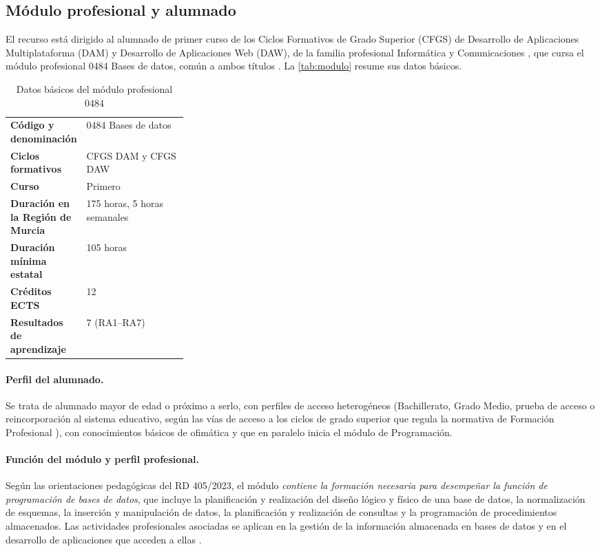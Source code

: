 \documentclass[11pt,a4paper]{article}
\begin{document}
\subsection{Módulo profesional y alumnado}
\label{sec:modulo}

El recurso está dirigido al alumnado de primer curso de los Ciclos Formativos de
Grado Superior (CFGS) de Desarrollo de Aplicaciones Multiplataforma (DAM) y
Desarrollo de Aplicaciones Web (DAW), de la familia profesional Informática y
Comunicaciones \cite{todofp}, que cursa el módulo profesional 0484 Bases de datos, común a ambos
títulos \cite{rd450,rd686,rd405,rd500}. La \autoref{tab:modulo} resume sus datos básicos.

\begin{table}[H]
\centering
\begin{tabularx}{\linewidth}{@{}>{\bfseries}p{0.3\linewidth}X@{}}
\toprule
Código y denominación & 0484 Bases de datos \\
Ciclos formativos & CFGS DAM y CFGS DAW \\
Curso & Primero \cite[anexos XLIV y XLV]{murcia2026} \\
Duración en la Región de Murcia & 175 horas, 5 horas semanales
                    \cite[anexos XLIV y XLV]{murcia2026} \\
Duración mínima estatal & 105 horas \cite{rd405} \\
Créditos ECTS & 12 \cite{rd405} \\
Resultados de aprendizaje & 7 (RA1--RA7) \\
\bottomrule
\end{tabularx}
\caption{Datos básicos del módulo profesional 0484}
\label{tab:modulo}
\end{table}

\paragraph{Perfil del alumnado.} Se trata de alumnado mayor de edad o próximo a serlo, con
perfiles de acceso heterogéneos (Bachillerato, Grado Medio, prueba de acceso o
reincorporación al sistema educativo, según las vías de acceso a los ciclos de grado
superior que regula la normativa de Formación Profesional \cite{lofp,rd659}), con
conocimientos básicos de ofimática y que en paralelo inicia el módulo de Programación.

\paragraph{Función del módulo y perfil profesional.} Según las orientaciones pedagógicas del
RD 405/2023, el módulo \textit{contiene la formación necesaria para desempeñar la función de
programación de bases de datos}, que incluye la planificación y realización del diseño
lógico y físico de una base de datos, la normalización de esquemas, la inserción y
manipulación de datos, la planificación y realización de consultas y la programación de
procedimientos almacenados. Las actividades profesionales asociadas se aplican en la gestión
de la información almacenada en bases de datos y en el desarrollo de aplicaciones que acceden
a ellas \cite{rd405}.
\end{document}
